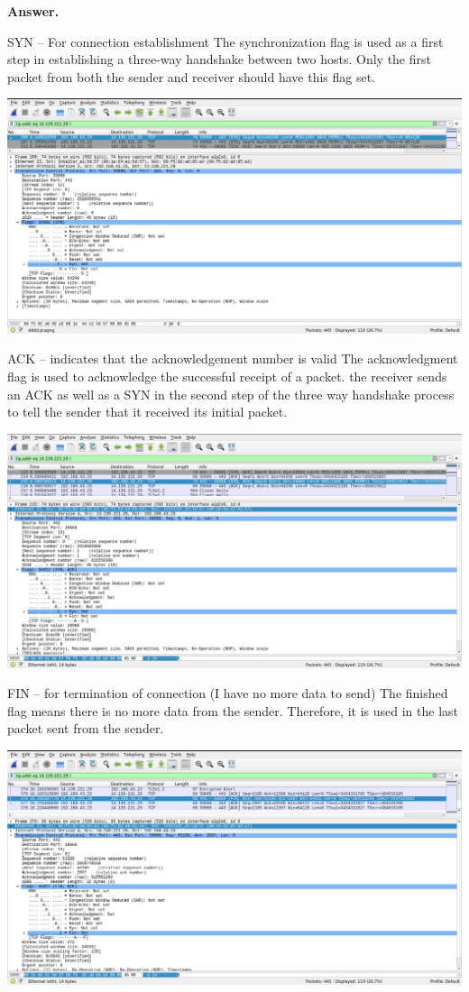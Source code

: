 \documentclass{article}
\begin{document}
\begin{enumerate}
\begin{enumerate}
\textbf{Answer.}

SYN – For connection establishment
The synchronization flag is used as a first step in establishing a three-way handshake between two
hosts. Only the first packet from both the sender and receiver should have this flag set.

\includegraphics[width=700pt]{Question3A1}
\pagebreak

ACK – indicates that the acknowledgement number is valid
The acknowledgment flag is used to acknowledge the successful receipt of a packet.
the receiver sends an ACK as well as a SYN in the second step of the three way handshake process
to tell the sender that it received its initial packet.

\includegraphics[width=700pt]{Question3A2}
\pagebreak

FIN – for termination of connection (I have no more data to send)
The finished flag means there is no more data from the sender. Therefore, it is used in the last
packet sent from the sender.

\includegraphics[width=700pt]{Question3A3}
\pagebreak


\end{enumerate}
\end{enumerate}
\end{document}
